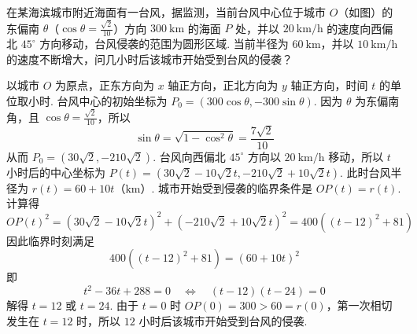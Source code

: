 \begin{problem}
在某海滨城市附近海面有一台风，据监测，当前台风中心位于城市 \(O\)（如图）的东偏南 \(\theta\)（\(\cos\theta=\frac{\sqrt2}{10}\)）方向 \(300 \mathrm{~km}\) 的海面 \(P\) 处，并以 \(20 \mathrm{~km}/\mathrm{h}\) 的速度向西偏北 \(45^{\circ}\) 方向移动，台风侵袭的范围为圆形区域. 当前半径为 \(60 \mathrm{~km}\)，并以 \(10 \mathrm{~km}/\mathrm{h}\) 的速度不断增大，问几小时后该城市开始受到台风的侵袭？


\begin{solution}
以城市 \(O\) 为原点，正东方向为 \(x\) 轴正方向，正北方向为 \(y\) 轴正方向，时间 \(t\) 的单位取小时. 台风中心的初始坐标为
\(P_0=\left(300\cos\theta,-300\sin\theta\right)\).
因为 \(\theta\) 为东偏南角，且 \(\cos\theta=\frac{\sqrt2}{10}\)，所以
\[
\sin\theta=\sqrt{1-\cos^2\theta}=\frac{7\sqrt2}{10}
\]
从而
\(P_0=\left(30\sqrt2,-210\sqrt2\right)\).
台风向西偏北 \(45^{\circ}\) 方向以 \(20 \mathrm{~km}/\mathrm{h}\) 移动，所以 \(t\) 小时后的中心坐标为
\(P(t)=\left(30\sqrt2-10\sqrt2t,-210\sqrt2+10\sqrt2t\right)\).
此时台风半径为 \(r(t)=60+10t\)（\(\mathrm{km}\)）. 城市开始受到侵袭的临界条件是 \(OP(t)=r(t)\). 计算得
\[
OP(t)^2=\left(30\sqrt2-10\sqrt2t\right)^2+\left(-210\sqrt2+10\sqrt2t\right)^2=400\left((t-12)^2+81\right)
\]
因此临界时刻满足
\[
400\left((t-12)^2+81\right)=(60+10t)^2
\]
即
\[
t^2-36t+288=0
\quad\Longleftrightarrow\quad
(t-12)(t-24)=0
\]
解得 \(t=12\) 或 \(t=24\). 由于 \(t=0\) 时 \(OP(0)=300>60=r(0)\)，第一次相切发生在 \(t=12\) 时，所以 \(12\) 小时后该城市开始受到台风的侵袭.
\end{solution}
\end{problem}

